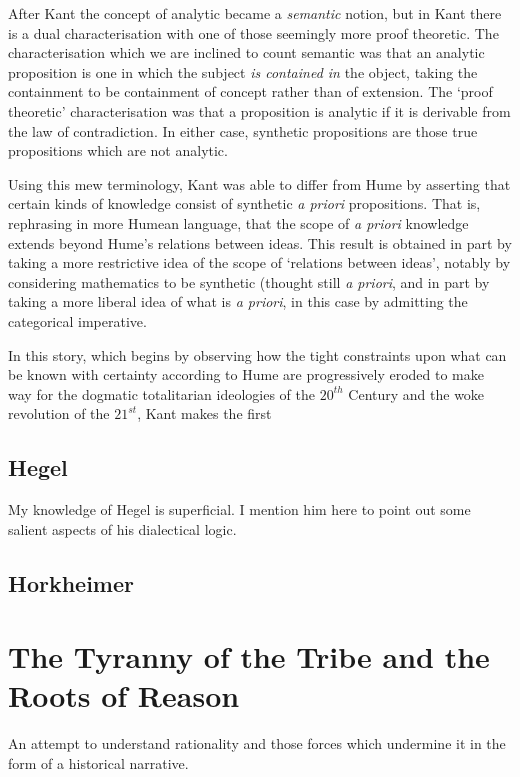\documentclass[10pt,titlepage]{book}
\begin{document}
After Kant the concept of analytic became a \emph{semantic} notion, but in Kant there is a dual characterisation with one of those seemingly more proof theoretic.
The characterisation which we are inclined to count semantic was that an analytic proposition is one in which the subject \emph{is contained in} the object, taking the containment to be containment of concept rather than of extension.
The `proof theoretic' characterisation was that a proposition is analytic if it is derivable from the law of contradiction.
In either case, synthetic propositions are those true propositions which are not analytic.

Using this mew terminology, Kant was able to differ from Hume by asserting that certain kinds of knowledge consist of synthetic \emph{a priori} propositions.
That is, rephrasing in more Humean language, that the scope of \emph{a priori} knowledge extends beyond Hume's relations between ideas.
This result is obtained in part by taking a more restrictive idea of the scope of `relations between ideas', notably by considering mathematics to be synthetic (thought still \emph{a priori}, and in part by taking a more liberal idea of what is \emph{a priori}, in this case by admitting the categorical imperative.

In this story, which begins by observing how the tight constraints upon what can be known with certainty according to Hume are progressively eroded to make way for the dogmatic totalitarian ideologies of the $20^{th}$ Century and the woke revolution of the $21^{st}$, Kant makes the first 

\section{Hegel}

My knowledge of Hegel is superficial.
I mention him here to point out some salient aspects of his dialectical logic.

\section{Horkheimer}



\chapter{The Tyranny of the Tribe and the Roots of Reason}

An attempt to understand rationality and those forces which undermine it in the form of a historical narrative.
\end{document}
